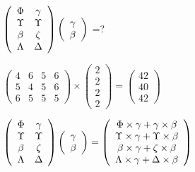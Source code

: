 \documentclass[12pt]{article}
\begin{document}
 
$  %
 \left( \begin{array}
 {
 c
 c
 }
 \Phi & 
 \gamma \\ 
 \Upsilon & 
 \Upsilon \\ 
 \beta & 
                    \zeta \\ 
 \Lambda & 
 \Delta
 \end{array} \right)
 \left( \begin{array}
 {
 c
 }
 \gamma \\ 
 \beta
 \end{array} \right)
$ =?
 
 
 
\noindent{}
 
 

 
$\left( \begin{array}{ccccccccccccccc}
           4 & 
           6 & 
           5 & 
           6 \\ 
           5 & 
           4 & 
           5 & 
           6 \\ 
           6 & 
           5 & 
           5 & 
           5
\end{array}\right) \times
\left( \begin{array}{c}
           2 \\ 
           2 \\ 
           2 \\ 
           2
\end{array}\right)  =
\left( \begin{array}{c}
          42 \\ 
          40 \\ 
          42
\end{array}\right)  $
 
$  %
 \left( \begin{array}
 {
 c
 c
 }
 \Phi & 
 \gamma \\ 
 \Upsilon & 
 \Upsilon \\ 
 \beta & 
                    \zeta \\ 
 \Lambda & 
 \Delta
 \end{array} \right)
 \left( \begin{array}
 {
 c
 }
 \gamma \\ 
 \beta
 \end{array} \right)
=
  \left( \begin{array}
 {
 c
 }
 \Phi \times  \gamma   +  \gamma \times  \beta \\ 
 \Upsilon \times  \gamma   +  \Upsilon \times  \beta \\ 
 \beta \times  \gamma   +                     \zeta \times  \beta \\ 
 \Lambda \times  \gamma   +  \Delta \times  \beta
 \end{array} \right)
$
 
\end{document}
